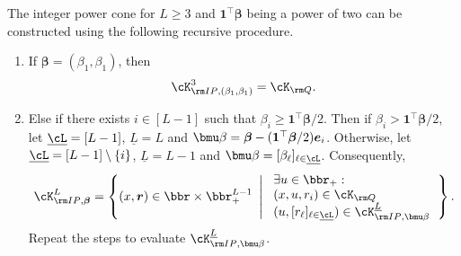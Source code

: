 \documentclass[mnsc, nonblindrev]{informswp}
\newcommand{\1}[1]{\mathds{1}{\left(#1\right)}}
\begin{document}
\begin{appendices}
\begin{theorem}
\label{thm:IntegerPowerConvert}
The integer power cone for $L\geq 3$ and $\bm 1^\top \bm \beta$ being a power of two can be constructed using the following recursive procedure.
\begin{enumerate}[Step 1.]

\item If  $\bm \beta = (\beta_1, \beta_1)$, then
$$
\cK^{3}_{{\rm IP},(\beta_1,\beta_1)} =   \cK_{
\rm Q}.  
$$

\item Else if there exists $i \in [L-1]$ such that $\beta_i \geq \bm 1^\top \bm \beta/2$. Then if $\beta_i >  \bm 1^\top \bm \beta/2$, let $\underline \cL = [L-1]$, $\underline L = L$ and $\bmu \beta =\bm \beta - (\bm 1^\top \bm \beta/2)\bm e_i$. Otherwise, let $\underline \cL = [L-1]\setminus\{i\}$, $\underline L = L-1$ and  $\bmu \beta = [\beta_\ell]_{\ell \in \underline \cL}$. Consequently, 
$$
\cK^{L}_{{\rm IP},\bm \beta} = \left\{ (x,\bm r) \in \bbr\times \bbr^{L-1}_+ ~\left|~ 
\begin{array}{ll} \exists u \in \bbr_+: \\
(x,u,r_i) \in \cK_{{\rm Q}} \\
(u, [r_\ell]_{\ell \in \underline \cL}) \in \cK^{\underline L}_{{\rm IP},\bmu \beta} \\
\end{array}
\right.\right\}.
$$
Repeat the steps to evaluate $\cK^{\underline L}_{{\rm IP},\bmu \beta}$.


\end{enumerate}
\end{theorem}
\end{appendices}
\end{document}
